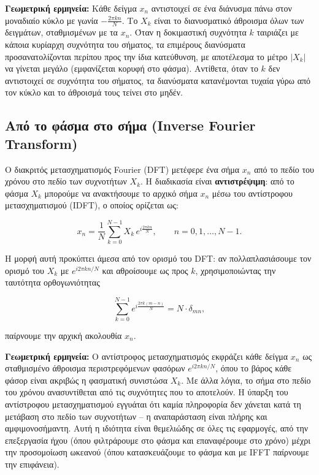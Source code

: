 \documentclass[a4paper, 11pt]{article}
\begin{document}
\textbf{Γεωμετρική ερμηνεία:} Κάθε δείγμα \(x_n\) αντιστοιχεί σε ένα
διάνυσμα πάνω στον μοναδιαίο κύκλο με γωνία \(-\frac{2\pi kn}{N}\). Το
\(X_k\) είναι το διανυσματικό άθροισμα όλων των δειγμάτων, σταθμισμένων
με τα \(x_n\). Όταν η δοκιμαστική συχνότητα \(k\) ταιριάζει με κάποια
κυρίαρχη συχνότητα του σήματος, τα επιμέρους διανύσματα
προσανατολίζονται περίπου προς την ίδια κατεύθυνση, με αποτέλεσμα το
μέτρο \(|X_k|\) να γίνεται μεγάλο (εμφανίζεται κορυφή στο φάσμα).
Αντίθετα, όταν το \(k\) δεν αντιστοιχεί σε συχνότητα του σήματος, τα
διανύσματα κατανέμονται τυχαία γύρω από τον κύκλο και το άθροισμά τους
τείνει στο μηδέν.

\subsection{Από το φάσμα στο σήμα (Inverse Fourier
Transform)}\label{ux3b1ux3c0ux3cc-ux3c4ux3bf-ux3c6ux3acux3c3ux3bcux3b1-ux3c3ux3c4ux3bf-ux3c3ux3aeux3bcux3b1-inverse-fourier-transform}

Ο διακριτός μετασχηματισμός Fourier (DFT) μετέφερε ένα σήμα \(x_n\) από
το πεδίο του χρόνου στο πεδίο των συχνοτήτων \(X_k\). Η διαδικασία είναι
\textbf{αντιστρέψιμη}: από το φάσμα \(X_k\) μπορούμε να ανακτήσουμε το
αρχικό σήμα \(x_n\) μέσω του αντίστροφου μετασχηματισμού (IDFT), ο
οποίος ορίζεται ως:

\[
x_n = \frac{1}{N} \sum_{k=0}^{N-1} X_k \, e^{i\frac{2\pi kn}{N}}, \qquad n = 0,1,\dots,N-1.
\]

Η μορφή αυτή προκύπτει άμεσα από τον ορισμό του DFT: αν πολλαπλασιάσουμε
τον ορισμό του \(X_k\) με \(e^{i2\pi kn/N}\) και αθροίσουμε ως προς
\(k\), χρησιμοποιώντας την ταυτότητα ορθογωνιότητας

\[
\sum_{k=0}^{N-1} e^{i\frac{2\pi k(m-n)}{N}} = N \cdot \delta_{mn},
\]

παίρνουμε την αρχική ακολουθία \(x_n\).

\textbf{Γεωμετρική ερμηνεία:} Ο αντίστροφος μετασχηματισμός εκφράζει
κάθε δείγμα \(x_n\) ως σταθμισμένο άθροισμα περιστρεφόμενων φασόρων
\(e^{i2\pi kn/N}\), όπου το βάρος κάθε φάσορ είναι ακριβώς η φασματική
συνιστώσα \(X_k\). Με άλλα λόγια, το σήμα στο πεδίο του χρόνου
ανασυντίθεται από τις συχνότητες που το αποτελούν. Η ύπαρξη του
αντίστροφου μετασχηματισμού εγγυάται ότι καμία πληροφορία δεν χάνεται
κατά τη μετάβαση στο πεδίο των συχνοτήτων -- η αναπαράσταση είναι πλήρης
και αμφιμονοσήμαντη. Αυτή η ιδιότητα είναι θεμελιώδης σε όλες τις
εφαρμογές, από την επεξεργασία ήχου (όπου φιλτράρουμε στο φάσμα και
επαναφέρουμε στο χρόνο) μέχρι την προσομοίωση ωκεανού (όπου
κατασκευάζουμε το φάσμα και με IFFT παίρνουμε την επιφάνεια).
\end{document}
